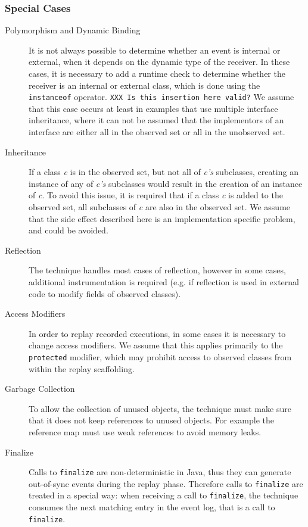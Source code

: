 \subsubsection{Special Cases}
\begin{description}
 \item [Polymorphism and Dynamic Binding] It is not always possible to determine whether an event is internal or external, when it depends on the dynamic type of the receiver. In these cases, it is necessary to add a runtime check to determine whether the receiver is an internal or external class, which is done using the \texttt{instanceof} operator. \texttt{XXX Is this insertion here valid?} We assume that this case occurs at least in examples that use multiple interface inheritance, where it can not be assumed that the implementors of an interface are either all in the observed set or all in the unobserved set.
 \item [Inheritance] If a class \emph{c} is in the observed set, but not all of \emph{c's} subclasses, creating an instance of any of \emph{c's} subclasses would result in the creation of an instance of \emph{c}. To avoid this issue, it is required that if a class \emph{c} is added to the observed set, all subclasses of \emph{c} are also in the observed set. We assume that the side effect described here is an implementation specific problem, and could be avoided.
 \item [Reflection] The technique handles most cases of reflection, however in some cases, additional instrumentation is required (e.g. if reflection is used in external code to modify fields of observed classes). 
 \item [Access Modifiers] In order to replay recorded executions, in some cases it is necessary to change access modifiers. We assume that this applies primarily to the \texttt{protected} modifier, which may prohibit access to observed classes from within the replay scaffolding.
 \item [Garbage Collection] To allow the collection of unused objects, the technique must make sure that it does not keep references to unused objects. For example the reference map must use weak references to avoid memory leaks.
 \item [Finalize] Calls to \texttt{finalize} are non-deterministic in Java, thus they can generate out-of-sync events during the replay phase. Therefore calls to \texttt{finalize} are treated in a special way: when receiving a call to \texttt{finalize}, the technique consumes the next matching entry in the event log, that is a call to \texttt{finalize}.
\end{description}

